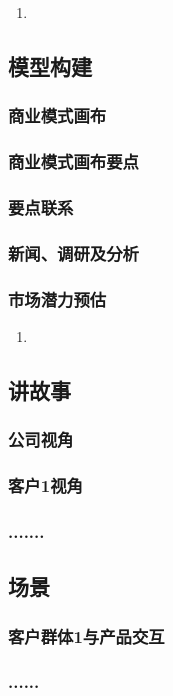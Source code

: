 \documentclass[a4paper]{ctexart}
\begin{document}
\begin{enumerate}[label=\alph*.]
  \item 
\end{enumerate}

\subsection{模型构建}

\subsubsection{商业模式画布}

\subsubsection{商业模式画布要点}

\subsubsection{要点联系}

\subsubsection{新闻、调研及分析}

\subsubsection{市场潜力预估}

\begin{enumerate}[label=\alph*.]
  \item 
\end{enumerate}

\subsection{讲故事}

\subsubsection{公司视角}

\subsubsection{客户1视角}

\subsubsection{.......}

\subsection{场景}

\subsubsection{客户群体1与产品交互}

\subsubsection{......}
\end{document}

